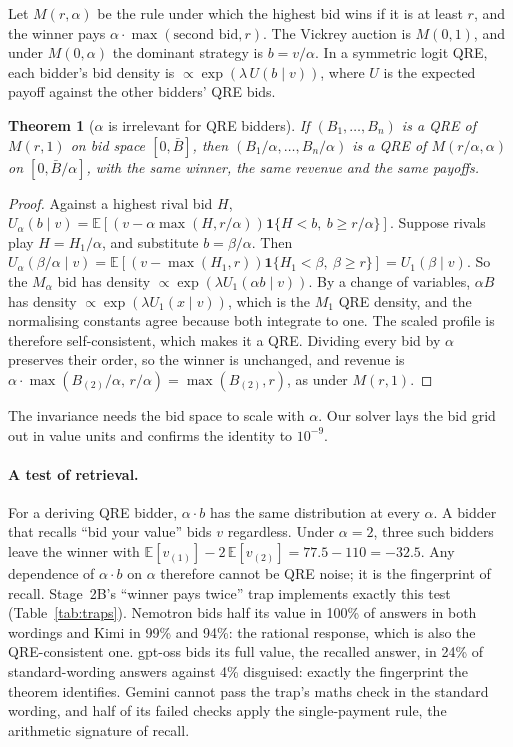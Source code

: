 \documentclass[10pt]{article}
\newtheorem{theorem}{Theorem}
\theoremstyle{definition}
\theoremstyle{remark}
\newcommand{\lam}{\lambda}
\begin{document}
Let $M(r,\alpha)$ be the rule under which the highest bid wins if it is at least $r$, and the
winner pays $\alpha\cdot\max(\text{second bid}, r)$. The Vickrey auction is $M(0,1)$, and under
$M(0,\alpha)$ the dominant strategy is $b=v/\alpha$. In a symmetric logit QRE, each bidder's bid
density is $\propto \exp(\lam\,U(b\mid v))$, where $U$ is the expected payoff against the other
bidders' QRE bids.

\begin{theorem}[$\alpha$ is irrelevant for QRE bidders]\label{thm:alpha}
If $(B_1,\dots,B_n)$ is a QRE of $M(r,1)$ on bid space $[0,\bar B]$, then
$(B_1/\alpha,\dots,B_n/\alpha)$ is a QRE of $M(r/\alpha,\alpha)$ on $[0,\bar B/\alpha]$, with the
same winner, the same revenue and the same payoffs.
\end{theorem}
\begin{proof}
Against a highest rival bid $H$, $U_\alpha(b\mid v)=\mathbb E[(v-\alpha\max(H,r/\alpha))\mathbf
1\{H<b,\ b\ge r/\alpha\}]$. Suppose rivals play $H=H_1/\alpha$, and substitute $b=\beta/\alpha$.
Then $U_\alpha(\beta/\alpha\mid v) = \mathbb E[(v-\max(H_1,r))\mathbf 1\{H_1<\beta,\ \beta\ge
r\}] = U_1(\beta\mid v)$. So the $M_\alpha$ bid has density $\propto\exp(\lam U_1(\alpha b\mid
v))$. By a change of variables, $\alpha B$ has density $\propto\exp(\lam U_1(x\mid v))$, which is
the $M_1$ QRE density, and the normalising constants agree because both integrate to one. The
scaled profile is therefore self-consistent, which makes it a QRE. Dividing every bid by $\alpha$
preserves their order, so the winner is unchanged, and revenue is
$\alpha\cdot\max(B_{(2)}/\alpha,\,r/\alpha)=\max(B_{(2)},r)$, as under $M(r,1)$.
\end{proof}

The invariance needs the bid space to scale with $\alpha$. Our solver lays the bid grid out in
value units and confirms the identity to $10^{-9}$.

\paragraph{A test of retrieval.} For a deriving QRE bidder, $\alpha\cdot b$ has the same
distribution at every $\alpha$. A bidder that recalls ``bid your value'' bids $v$ regardless. Under
$\alpha=2$, three such bidders leave the winner with
$\mathbb E[v_{(1)}]-2\,\mathbb E[v_{(2)}]=77.5-110=-32.5$. Any dependence of $\alpha\cdot b$ on
$\alpha$ therefore cannot be QRE noise; it is the fingerprint of recall. Stage~2B's ``winner pays
twice'' trap implements exactly this test (Table~\ref{tab:traps}). Nemotron bids half its value
in 100\% of answers in both wordings and Kimi in 99\% and 94\%: the rational response, which is
also the QRE-consistent one. gpt-oss bids its full value, the recalled answer, in 24\% of
standard-wording answers against 4\% disguised: exactly the fingerprint the theorem identifies.
Gemini cannot pass the trap's maths check in the standard wording, and half of its failed checks
apply the single-payment rule, the arithmetic signature of recall.
\end{document}
